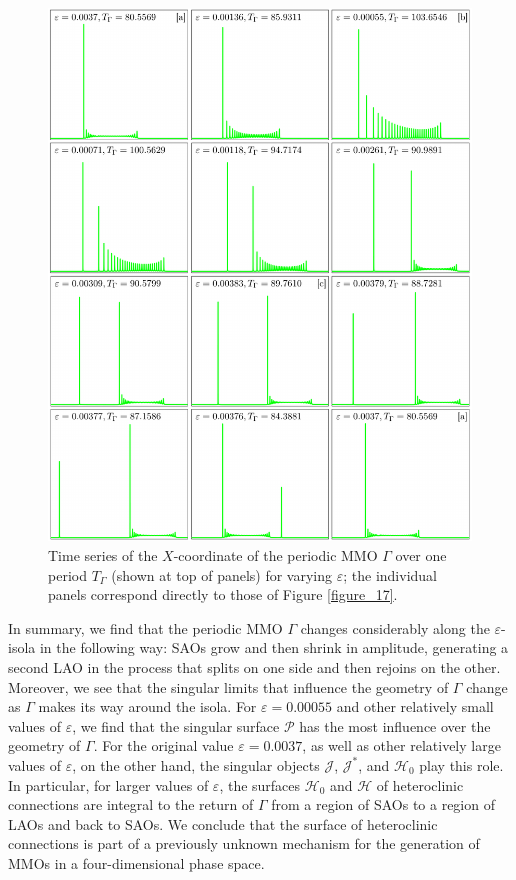 \documentclass{ws-ijbc}
\begin{document}
\begin{figure}[H]
\centering
\includegraphics[]{./figures/MKMO_18.pdf}
\caption{Time series of the $X$-coordinate of the periodic MMO $\Gamma$ over one period $T_\Gamma$ (shown at top of panels) for varying $\varepsilon$; the individual panels correspond directly to those of Figure \ref{figure_17}.}
\label{figure_18}
\end{figure}

In summary, we find that the periodic MMO $\Gamma$ changes considerably along the $\varepsilon$-isola in the following way: SAOs grow and then shrink in amplitude, generating a second LAO in the process that splits on one side and then rejoins on the other.  Moreover, we see that the singular limits that influence the geometry of $\Gamma$ change as $\Gamma$ makes its way around the isola.  For $\varepsilon=0.00055$ and other relatively small values of $\varepsilon$, we find that the singular surface $\mathscr{P}$ has the most influence over the geometry of $\Gamma$.  For the original value $\varepsilon=0.0037$, as well as other relatively large values of $\varepsilon$, on the other hand, the singular objects $\mathscr{J}$, $\mathscr{J}^*$, and $\mathscr{H}_0$ play this role.  In particular, for larger values of $\varepsilon$, the surfaces $\mathscr{H}_0$ and $\mathscr{H}$ of heteroclinic connections are integral to the return of $\Gamma$ from a region of SAOs to a region of LAOs and back to SAOs.  We conclude that the surface of heteroclinic connections is part of a previously unknown mechanism for the generation of MMOs in a four-dimensional phase space.
\end{document}
